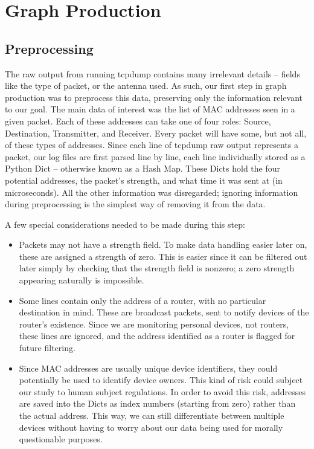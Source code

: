 \section{Graph Production}

\subsection*{Preprocessing}


The raw output from running tcpdump contains many irrelevant details -- fields like the type of packet, or the antenna used.
As such, our first step in graph production was to preprocess this data, preserving only the information relevant to our goal.
The main data of interest was the list of MAC addresses seen in a given packet.
Each of these addresses can take one of four roles: Source, Destination, Transmitter, and Receiver.
Every packet will have some, but not all, of these types of addresses.
Since each line of tcpdump raw output represents a packet, our log files are first parsed line by line, each line individually stored as a Python Dict -- otherwise known as a Hash Map.
These Dicts hold the four potential addresses, the packet's strength, and what time it was sent at (in microseconds).
All the other information was disregarded; ignoring information during preprocessing is the simplest way of removing it from the data.

A few special considerations needed to be made during this step:
\begin{itemize}
\item Packets may not have a strength field.
  To make data handling easier later on, these are assigned a strength of zero.
  This is easier since it can be filtered out later simply by checking that the strength field is nonzero; a zero strength appearing naturally is impossible. 
\item Some lines contain only the address of a router, with no particular destination in mind.
  These are broadcast packets, sent to notify devices of the router's existence.
  Since we are monitoring personal devices, not routers, these lines are ignored, and the address identified as a router is flagged for future filtering.
\item Since MAC addresses are usually unique device identifiers, they could potentially be used to identify device owners.
  This kind of risk could subject our study to human subject regulations.
  In order to avoid this risk, addresses are saved into the Dicts as index numbers (starting from zero) rather than the actual address.
  This way, we can still differentiate between multiple devices without having to worry about our data being used for morally questionable purposes.
\end{itemize}

